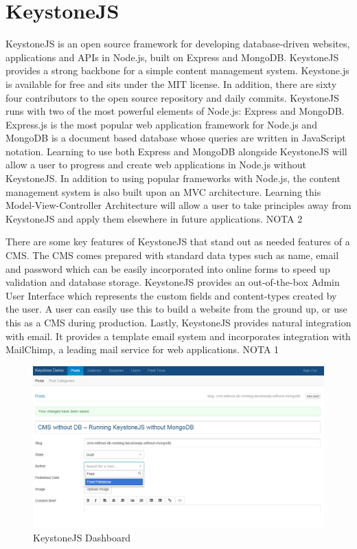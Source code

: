\section{KeystoneJS}
\label{sec:CMS_ksjs}

KeystoneJS is an open source framework for developing database-driven websites, applications and APIs in Node.js, built on Express and MongoDB.
KeystoneJS provides a strong backbone for a simple content management system. Keystone.js is available for free and sits under the MIT license. In addition, there are sixty four contributors to the open source repository and daily commits.
KeystoneJS runs with two of the most powerful elements of Node.js: Express and MongoDB. Express.js is the most popular web application framework for Node.js and MongoDB is a document based database whose queries are written in JavaScript notation. Learning to use both Express and MongoDB alongside KeystoneJS will allow a user to progress and create web applications in Node.js without KeystoneJS. In addition to using popular frameworks with Node.js, the content management system is also built upon an MVC architecture. Learning this Model-View-Controller Architecture will allow a user to take principles away from KeystoneJS and apply them elsewhere in future applications. NOTA 2

There are some key features of KeystoneJS that stand out as needed features of a CMS. The CMS comes prepared with standard data types such as name, email and password which can be easily incorporated into online forms to speed up validation and database storage. KeystoneJS provides an out-of-the-box Admin User Interface which represents the custom fields and content-types created by the user. A user can easily use this to build a website from the ground up, or use this as a CMS during production. Lastly, KeystoneJS provides natural integration with email. It provides a template email system and incorporates integration with MailChimp, a leading mail service for web applications. NOTA 1




\begin {figure}[h]
\graphicspath{{images/chapter_cms/}}
\includegraphics[width=\textwidth]{ksjs_dash}
\caption{KeystoneJS Dashboard}
\end {figure}